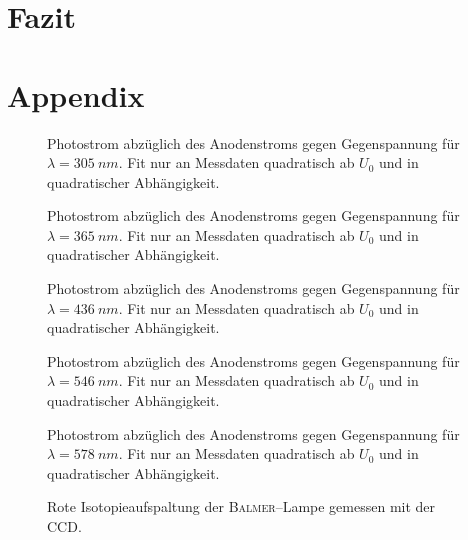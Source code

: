 \documentclass[sn-mathphys-num,iicol]{sn-jnl}
\theoremstyle{thmstyleone}
\theoremstyle{thmstyletwo}
\theoremstyle{thmstylethree}
\begin{document}



\section{Fazit}

\clearpage
\section{Appendix}
\begin{figure}[h]
        \centering
        \resizebox{.5\textwidth}{!}{}
        \caption{Photostrom abzüglich des Anodenstroms gegen Gegenspannung für $\lambda =\SI{305}{n m}$. Fit nur an Messdaten quadratisch ab $U_0$ und in quadratischer Abhängigkeit.} \label{fig:photo_auswertung_305}
\end{figure}
\begin{figure}[h]
        \centering
        \resizebox{.5\textwidth}{!}{}
        \caption{Photostrom abzüglich des Anodenstroms gegen Gegenspannung für $\lambda =\SI{365}{n m}$. Fit nur an Messdaten quadratisch ab $U_0$ und in quadratischer Abhängigkeit.}
\end{figure}
\begin{figure}[h]
        \centering
        \resizebox{.5\textwidth}{!}{}
        \caption{Photostrom abzüglich des Anodenstroms gegen Gegenspannung für $\lambda =\SI{436}{n m}$. Fit nur an Messdaten quadratisch ab $U_0$ und in quadratischer Abhängigkeit.}
\end{figure}
\begin{figure}[h]
        \centering
        \resizebox{.5\textwidth}{!}{}
        \caption{Photostrom abzüglich des Anodenstroms gegen Gegenspannung für $\lambda =\SI{546}{n m}$. Fit nur an Messdaten quadratisch ab $U_0$ und in quadratischer Abhängigkeit.}
\end{figure}
\begin{figure}[h]
        \centering
        \resizebox{.5\textwidth}{!}{}
        \caption{Photostrom abzüglich des Anodenstroms gegen Gegenspannung für $\lambda =\SI{578}{n m}$. Fit nur an Messdaten quadratisch ab $U_0$ und in quadratischer Abhängigkeit.} \label{fig:photo_auswertung_578}
\end{figure}
\begin{figure}[h]
        \centering
        \resizebox{.5\textwidth}{!}{}
        \caption{Rote Isotopieaufspaltung der \textsc{Balmer}--Lampe gemessen mit der CCD.} \label{fig:ccdrot}
\end{figure}
\end{document}
